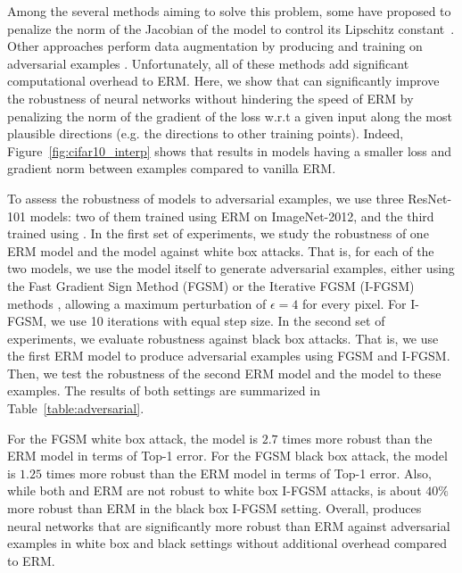 Among the several methods aiming to solve this problem,
some have proposed to penalize the norm of the Jacobian of the model to control
its Lipschitz constant~\citep{drucker1992improving, cisse2017parseval, bartlett2017spectrally,
hein2017formal}. Other approaches perform data augmentation by producing and
training on adversarial examples \citep{goodfellow2014explaining}.
Unfortunately, all of these methods add significant computational overhead to
ERM. Here, we show that
\mixup{} can significantly improve the robustness of neural networks without
hindering the speed of ERM by penalizing the norm of the gradient of the loss w.r.t a given input along the most plausible directions
(e.g. the directions to other training points). Indeed, Figure~\ref{fig:cifar10_interp} shows that \mixup{} results in models having a smaller loss and gradient norm between
examples compared to vanilla ERM.

To assess the robustness of \mixup{} models to adversarial examples, we use
three ResNet-101 models: two of them trained using ERM on ImageNet-2012, and
the third trained using \mixup{}. In the first set of experiments, we study the
robustness of one ERM model and the \mixup{} model against white box attacks.
That is, for each of the two models, we use the model itself to generate
adversarial examples, either using the Fast Gradient Sign Method (FGSM) or the
Iterative FGSM (I-FGSM) methods \citep{goodfellow2014explaining}, allowing a
maximum perturbation of $\epsilon=4$ for every pixel. For I-FGSM, we use 10
iterations with equal step size. In the second set of experiments, we evaluate
robustness against black box attacks. That is, we use the first ERM model to
produce adversarial examples using FGSM and I-FGSM. Then, we test the
robustness of the second ERM model and the \mixup{} model to these examples.
The results of both settings are summarized in Table~\ref{table:adversarial}.

For the FGSM white box attack, the \mixup{} model is $2.7$ times more robust
than the ERM model in terms of Top-1 error. For the FGSM black box attack, the
\mixup{} model is $1.25$ times more robust than the ERM model in terms of Top-1
error. Also, while both \mixup{} and ERM are not robust to white box I-FGSM
attacks, \mixup{} is about $40\%$ more robust than ERM in the black box I-FGSM
setting. Overall, \mixup{} produces neural networks that are significantly more
robust than ERM against adversarial examples in white box and black settings without additional overhead compared to ERM.

